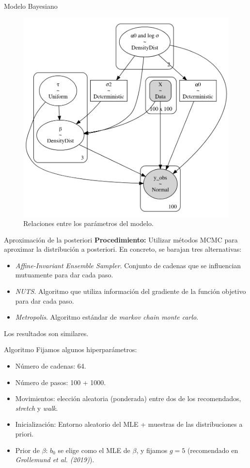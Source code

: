 \documentclass[10pt, spanish, professionalfonts]{beamer}
\begin{document}
\begin{frame}{Modelo Bayesiano}
  \begin{figure}
    \includegraphics[width=.6\textwidth]{img/modelo_lin}
    \caption{Relaciones entre los parámetros del modelo.}
  \end{figure}
\end{frame}

\begin{frame}{Aproximación de la posteriori}
  \textbf{Procedimiento:} Utilizar métodos MCMC para aproximar la distribución a posteriori. En concreto, se barajan tres alternativas:
  \begin{itemize}
    \item {\color{Maroon}\textit{Affine-Invariant Ensemble Sampler}}. Conjunto de cadenas que se influencian mutuamente para dar cada paso.
    \item \textit{NUTS}. Algoritmo que utiliza información del gradiente de la función objetivo para dar cada paso.
    \item \textit{Metropolis}. Algoritmo estándar de \textit{markov chain monte carlo}.
  \end{itemize}

  \vspace{1em}

  Los resultados son similares.
\end{frame}

\begin{frame}{Algoritmo}
  Fijamos algunos hiperparámetros:
  \begin{itemize}
    \item Número de cadenas: 64.
    \item Número de pasos: 100 + 1000.
    \item Movimientos: elección aleatoria (ponderada) entre dos de los recomendados, \textit{stretch} y \textit{walk}.
    \item Inicialización: Entorno aleatorio del MLE + muestras de las distribuciones a priori.
    \item Prior de \(\beta\): \(b_0\) se elige como el MLE de \(\beta\), y fijamos \(g=5\) (recomendado en \textit{Grollemund et al. (2019)}).
  \end{itemize}
  \vspace{1em}
\end{frame}
\end{document}

